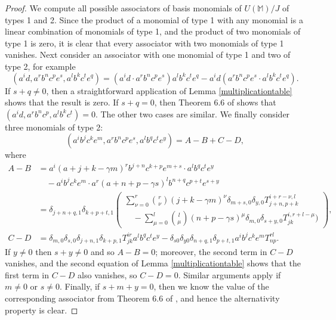 \documentclass{amsart}
\theoremstyle{plain}
\theoremstyle{definition}
\begin{document}
\begin{proof}
We compute all possible associators of basis monomials of $U(\mathbb{M})/J$ of
types 1 and 2. Since the product of a monomial of type 1 with any monomial is a
linear combination of monomials of type 1, and the product of two monomials of
type 1 is zero, it is clear that every associator with two monomials of type 1
vanishes. Next consider an associator with one monomial of type 1 and two of
type 2, for example
  \[
  ( a^i d, a^r b^n c^p e^s, a^l b^k c^t e^q )
  =
  ( a^i d \cdot a^r b^n c^p e^s ) a^l b^k c^t e^q
  -
  a^i d ( a^r b^n c^p e^s \cdot a^l b^k c^t e^q ).
  \]
If $s + q \ne 0$, then a straightforward application of Lemma
\ref{multiplicationtable} shows that the result is zero.  If $s + q = 0$, then
Theorem 6.6 of \cite{BHPU} shows that $(a^i d, a^r b^n c^p, a^l b^k c^t) = 0$.
The other two cases are similar. We finally consider three monomials of type 2:
  \[
  ( a^i b^j c^k e^m, a^r b^n c^p e^s, a^l b^q c^t e^y )
  =
  A - B + C - D,
  \]
where
  \allowdisplaybreaks
  \begin{align*}
  A - B
  &=
  a^i (a{+}j{+}k{-}\gamma m)^r b^{j+n} c^{k+p} e^{m+s} \cdot a^l b^q c^t e^y
  \\
  &\quad
  -
  a^i b^j c^k e^m \cdot a^r (a{+}n{+}p{-}\gamma s)^l b^{n+q} c^{p+t} e^{s+y}
  \\
  &=
  \delta_{j+n+q, 1} \delta_{k+p+t, 1}
  \left(
  \begin{array}{l}
  \sum_{\nu=0}^r
  \binom{r}{\nu}
  (j{+}k{-}\gamma m)^{\nu}
  \delta_{m+s,0}
  \delta_{y,0}
  T_{j+n,p+k}^{i+r-\nu,l}
  \\[6pt]
  \quad
  -
  \sum_{\mu=0}^l
  \binom{l}{\mu}
  (n{+}p{-}\gamma s)^{\mu}
  \delta_{m,0}
  \delta_{s+y,0}
  T_{jk}^{i, r+l-\mu})
  \end{array}
  \right),
  \\[6pt]
  C - D
  &=
  \delta_{m,0}
  \delta_{s,0}
  \delta_{j+n,1}
  \delta_{k+p,1}
  T_{jk}^{ir}
  a^l b^q c^t e^y
  -
  \delta_{s0}
  \delta_{y0}
  \delta_{n+q,1}
  \delta_{p+t,1}
  a^i b^j c^k e^m
  T_{np}^{rl}.
\end{align*}
If $y \ne 0$ then $s + y \ne 0$ and so $A - B = 0$; moreover, the second term
in $C - D$ vanishes, and the second equation of Lemma \ref{multiplicationtable}
shows that the first term in $C - D$ also vanishes, so $C - D = 0$. Similar
arguments apply if $m \ne 0$ or $s \ne 0$. Finally, if $s + m + y = 0$, then we
know the value of the corresponding associator from Theorem 6.6 of \cite{BHPU},
and hence the alternativity property is clear.
\end{proof}
\end{document}

